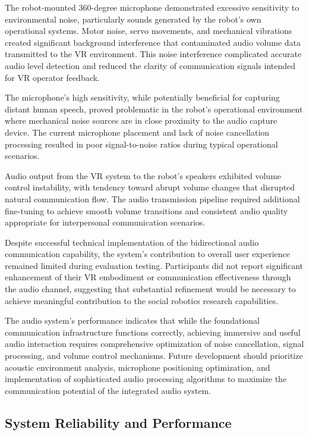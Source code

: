 The robot-mounted 360-degree microphone demonstrated excessive sensitivity to environmental noise, particularly sounds generated by the robot's own operational systems. Motor noise, servo movements, and mechanical vibrations created significant background interference that contaminated audio volume data transmitted to the VR environment. This noise interference complicated accurate audio level detection and reduced the clarity of communication signals intended for VR operator feedback.

The microphone's high sensitivity, while potentially beneficial for capturing distant human speech, proved problematic in the robot's operational environment where mechanical noise sources are in close proximity to the audio capture device. The current microphone placement and lack of noise cancellation processing resulted in poor signal-to-noise ratios during typical operational scenarios.

Audio output from the VR system to the robot's speakers exhibited volume control instability, with tendency toward abrupt volume changes that disrupted natural communication flow. The audio transmission pipeline required additional fine-tuning to achieve smooth volume transitions and consistent audio quality appropriate for interpersonal communication scenarios.

Despite successful technical implementation of the bidirectional audio communication capability, the system's contribution to overall user experience remained limited during evaluation testing. Participants did not report significant enhancement of their VR embodiment or communication effectiveness through the audio channel, suggesting that substantial refinement would be necessary to achieve meaningful contribution to the social robotics research capabilities.

The audio system's performance indicates that while the foundational communication infrastructure functions correctly, achieving immersive and useful audio interaction requires comprehensive optimization of noise cancellation, signal processing, and volume control mechanisms. Future development should prioritize acoustic environment analysis, microphone positioning optimization, and implementation of sophisticated audio processing algorithms to maximize the communication potential of the integrated audio system.

\subsection{System Reliability and Performance}

